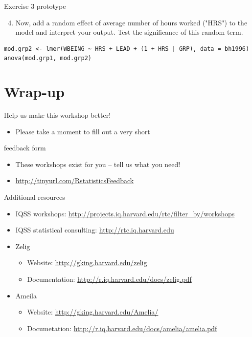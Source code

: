 \documentclass[table,smaller]{beamer}
\begin{document}
\begin{frame}[fragile,label=sec-6-4]{Exercise 3 prototype}
\begin{enumerate}
\setcounter{enumi}{3}
\item Now, add a random effect of average number of hours worked ("HRS") to the model and interpret your output.  Test the significance of this random term.
\end{enumerate}
\begin{verbatim}
mod.grp2 <- lmer(WBEING ~ HRS + LEAD + (1 + HRS | GRP), data = bh1996)
anova(mod.grp1, mod.grp2)
\end{verbatim}
\end{frame}


\section{Wrap-up}
\label{sec-7}

\begin{frame}[label=sec-7-1]{Help us make this workshop better!}
\begin{itemize}
\item Please take a moment to fill out a very short
\end{itemize}
feedback form 
\begin{itemize}
\item These workshops exist for you -- tell us what you need!
\item \url{http://tinyurl.com/RstatisticsFeedback}
\end{itemize}
\end{frame}


\begin{frame}[label=sec-7-2]{Additional resources}
\begin{itemize}
\item IQSS workshops: \url{http://projects.iq.harvard.edu/rtc/filter_by/workshops}
\item IQSS statistical consulting: \url{http://rtc.iq.harvard.edu}

\item Zelig
\begin{itemize}
\item Website: \url{http://gking.harvard.edu/zelig}
\item Documentation: \url{http://r.iq.harvard.edu/docs/zelig.pdf}
\end{itemize}
\item Ameila
\begin{itemize}
\item Website: \url{http://gking.harvard.edu/Amelia/}
\item Documetation: \url{http://r.iq.harvard.edu/docs/amelia/amelia.pdf}
\end{itemize}
\end{itemize}
\end{frame}
\end{document}
